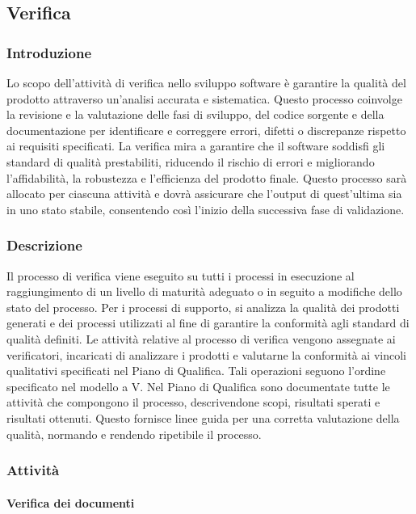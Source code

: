 \subsection{Verifica}\label{sec:verifica}
\subsubsection{Introduzione}
Lo scopo dell'attività di verifica nello sviluppo software è garantire la qualità del prodotto attraverso un'analisi accurata e sistematica.
Questo processo coinvolge la revisione e la valutazione delle fasi di sviluppo, del codice sorgente e della documentazione per identificare e correggere errori, difetti o discrepanze rispetto ai requisiti specificati.
La verifica mira a garantire che il software soddisfi gli standard di qualità prestabiliti, riducendo il rischio di errori e migliorando l'affidabilità, la robustezza e l'efficienza del prodotto finale.
Questo processo sarà allocato per ciascuna attività e dovrà assicurare che l'output di quest'ultima sia in uno stato stabile, consentendo così l'inizio della successiva fase di validazione.

\subsubsection{Descrizione}
Il processo di verifica viene eseguito su tutti i processi in esecuzione al raggiungimento di un livello di maturità adeguato o in seguito a modifiche dello stato del processo. Per i processi di supporto, si analizza la qualità dei prodotti generati e dei processi utilizzati al fine di garantire la conformità agli standard di qualità definiti.
Le attività relative al processo di verifica vengono assegnate ai verificatori, incaricati di analizzare i prodotti e valutarne la conformità ai vincoli qualitativi specificati nel Piano di Qualifica. Tali operazioni seguono l'ordine specificato nel modello a V.
Nel Piano di Qualifica sono documentate tutte le attività che compongono il processo, descrivendone scopi, risultati sperati e risultati ottenuti. Questo fornisce linee guida per una corretta valutazione della qualità, normando e rendendo ripetibile il processo.
\subsubsection{Attività}
\paragraph{Verifica dei documenti}\label{sec:verificatori}


